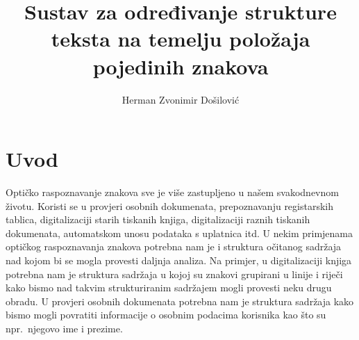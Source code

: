 \documentclass[times, utf8, zavrsni]{fer}
\begin{document}


\title{
    Sustav za određivanje strukture teksta na temelju položaja pojedinih znakova
}

\author{Herman Zvonimir Došilović}

\maketitle




\tableofcontents
















\chapter{Uvod}
Optičko raspoznavanje znakova sve je više zastupljeno u našem svakodnevnom
životu. Koristi se u provjeri osobnih dokumenata, prepoznavanju registarskih
tablica, digitalizaciji starih tiskanih knjiga, digitalizaciji raznih tiskanih
dokumenata, automatskom unosu podataka s uplatnica itd. U nekim primjenama
optičkog raspoznavanja znakova potrebna nam je i struktura očitanog sadržaja
nad kojom bi se mogla provesti daljnja analiza. Na primjer, u digitalizaciji
knjiga potrebna nam je struktura sadržaja u kojoj su znakovi grupirani u linije
i riječi kako bismo nad takvim strukturiranim sadržajem mogli provesti neku
drugu obradu. U provjeri osobnih dokumenata potrebna nam je struktura sadržaja
kako bismo mogli povratiti informacije o osobnim podacima korisnika kao što su
npr.\ njegovo ime i prezime.
\end{document}
